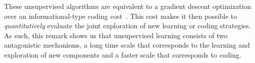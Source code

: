 \documentclass[a4paper, 11pt, draft]{article} %
\begin{document}
These unsupervised algorithms are equivalent to a gradient descent optimization over an informational-type coding cost~\citep{Kingma13}. This cost makes it then possible to \emph{quantitatively} evaluate the joint exploration of new learning or coding strategies.
As such, this remark shows us that unsupervised learning consists of two antagonistic mechanisms, a long time scale that corresponds to the learning and exploration of new components and a faster scale that corresponds to coding.
\end{document}
